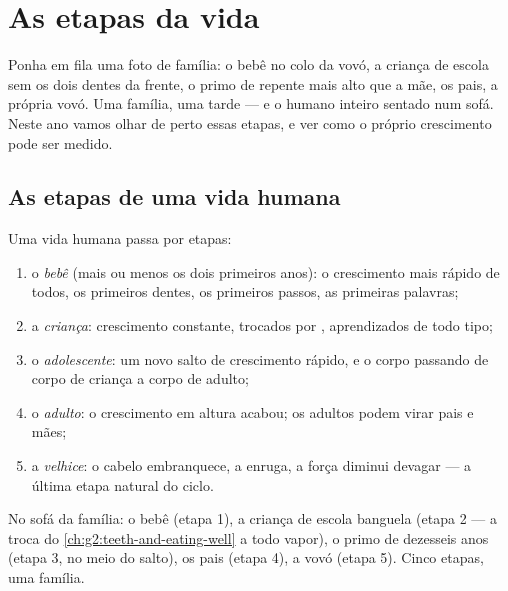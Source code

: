 \chapter{As etapas da vida}\label{ch:g3:stages-of-life}

Ponha em fila uma foto de família: o bebê no colo da vovó, a criança
de escola sem os dois dentes da frente, o primo  de
repente mais alto que a mãe, os pais, a própria vovó. Uma família,
uma tarde --- e o  humano inteiro sentado num sofá.
Neste ano vamos olhar de perto essas etapas, e ver como o próprio
crescimento pode ser medido.

\section{As etapas de uma vida humana}

\begin{definition}\label{def:g3:stages-of-life:stages}
Uma vida humana passa por etapas:
\begin{enumerate}
  \item o \emph{bebê} (mais ou menos os dois primeiros
        anos): o crescimento mais rápido de todos, os primeiros
        dentes, os primeiros passos, as primeiras palavras;
  \item a \emph{criança}: crescimento constante,
         trocados por ,
        aprendizados de todo tipo;
  \item o \emph{adolescente}: um novo salto de
        crescimento rápido, e o corpo passando de corpo de criança
        a corpo de adulto;
  \item o \emph{adulto}: o crescimento em altura
        acabou; os adultos podem virar pais e mães;
  \item a \emph{velhice}: o cabelo embranquece, a
         enruga, a força diminui devagar --- a última etapa
        natural do ciclo.
\end{enumerate}
\end{definition}

\begin{example}\label{ex:g3:stages-of-life:sofa}
No sofá da família: o bebê (etapa 1), a criança de escola banguela
(etapa 2 --- a troca do \cref{ch:g2:teeth-and-eating-well} a todo
vapor), o primo de dezesseis anos (etapa 3, no meio do salto), os
pais (etapa 4), a vovó (etapa 5). Cinco etapas, uma família.
\end{example}

